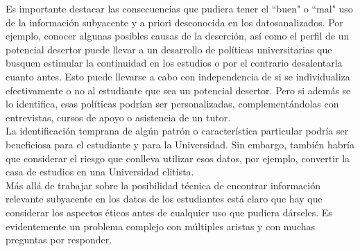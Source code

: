 


Es importante destacar las consecuencias que pudiera tener el ``buen" o ``mal" uso de la información subyacente y a priori desconocida en los datosanalizados. Por ejemplo, conocer algunas posibles causas de la deserción, así como el perfil de un potencial desertor puede llevar a un desarrollo de políticas universitarias
que busquen estimular la continuidad en los estudios o por el contrario desalentarla
cuanto antes. Esto puede llevarse a cabo con independencia de si se individualiza
efectivamente o no al estudiante que sea un potencial desertor. Pero si además se lo
identifica, esas políticas podrían ser personalizadas, complementándolas con
entrevistas, cursos de apoyo o asistencia de un tutor. \\
La identificación temprana de algún patrón o característica particular podría ser beneficiosa para el estudiante y para la Universidad. Sin embargo, también habría que considerar el riesgo que conlleva utilizar esos datos, por ejemplo, convertir la casa de estudios en una Universidad elitista.\\
Más allá de trabajar sobre la posibilidad técnica de encontrar información relevante
subyacente en los datos de los estudiantes está claro que hay que considerar los
aspectos éticos antes de cualquier uso que pudiera dárseles. Es evidentemente un
problema complejo con múltiples aristas y con muchas preguntas por responder.

